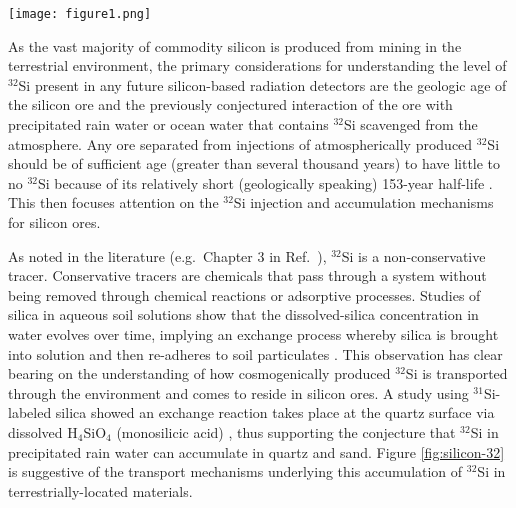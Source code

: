 \documentclass[final,5p]{elsarticle}
\def\si{$^{32}$Si\xspace}
\begin{document}
\begin{figure*}[ht]
\centering
\texttt{[image: figure1.png]}
\caption{\small Conjectured transport and accumulation of cosmogenically created \si in the terrestrial environment. Cosmic rays interact with $^{40}$Ar in the atmosphere to spallate \si that is then transported into the terrestrial environment via precipitation, leading to accumulation of \si in:  A) streams and settling ponds that may be sources of processing water for silicon mining and refinement; B) surface sands and near-surface silicon deposits; and C) oceans and lakes, where it can be transported by biological organisms and ultimately incorporated into the underlying sediments.} 
\label{fig:silicon-32}
\end{figure*}

As the vast majority of commodity silicon is produced from mining in the terrestrial environment, the primary considerations for understanding the level of \si present in any future silicon-based radiation detectors are the geologic age of the silicon ore and the previously conjectured \cite{plaga} interaction of the ore with precipitated rain water or ocean water that contains \si scavenged from the atmosphere. Any ore separated from injections of atmospherically produced \si should be of sufficient age (greater than several thousand years) to have little to no \si because of its relatively short (geologically speaking) 153-year half-life \cite{NNDC}. This then focuses attention on the \si injection and accumulation mechanisms for silicon ores. 

As noted in the literature (e.g.\ Chapter 3 in Ref.\ \cite{lal6}), \si is a  non-conservative tracer. Conservative tracers are chemicals that pass through a system without being removed through chemical reactions or adsorptive processes. Studies of silica in aqueous soil solutions show that the dissolved-silica concentration in water evolves over time, implying an exchange process whereby silica is brought into solution and then re-adheres to soil particulates \cite{mckeague}. This observation has clear bearing on the understanding of how cosmogenically produced \si is transported through the environment and comes to reside in silicon ores. A study using $^{31}$Si-labeled silica showed an exchange reaction takes place at the quartz surface via dissolved H$_4$SiO$_4$ (monosilicic acid) \cite{holt}, thus supporting the conjecture that \si in precipitated rain water can accumulate in quartz and sand. Figure \ref{fig:silicon-32} is suggestive of the transport mechanisms underlying this accumulation of \si in terrestrially-located materials.
\end{document}
